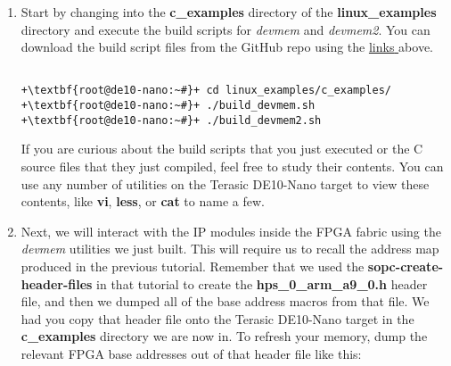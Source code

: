\begin{flushleft}
\noindent

\begin{enumerate}[
	label=\textbf{Step \arabic*.},
	leftmargin=*,
	widest={00},
	align=left]

We want to interact with the IP modules inside the FPGA fabric, and in the Linux environment there are a couple of utility programs that allow us to perform simple peek and poke operations into the memory map called \emph{devmem} and \emph{devmem2}.  These programs are not built into the default image for the Terasic DE10-Nano SD card so we had you download the source files from the internet and place them on the target so we can build them and use them.

\item Start by changing into the \textbf{c\_examples} directory of the \textbf{linux\_examples} directory and execute the build scripts for \emph{devmem} and \emph{devmem2}.  You can download the build script files from the GitHub repo using the \hyperlink{GitHub-files}{\underline{links}
} above.

\begin{verbatim}

+\textbf{root@de10-nano:~#}+ cd linux_examples/c_examples/
+\textbf{root@de10-nano:~#}+ ./build_devmem.sh
+\textbf{root@de10-nano:~#}+ ./build_devmem2.sh

\end{verbatim}

If you are curious about the build scripts that you just executed or the C source files that they just compiled, feel free to study their contents.  You can use any number of utilities on the Terasic DE10-Nano target to view these contents, like \textbf{vi}, \textbf{less}, or \textbf{cat} to name a few.

\item Next, we will interact with the IP modules inside the FPGA fabric using the \emph{devmem} utilities we just built. This will require us to recall the address map produced in the previous tutorial.  Remember that we used the \textbf{sopc-create-header-files} in that tutorial to create the \textbf{hps\_0\_arm\_a9\_0.h} header file, and then we dumped all of the base address macros from that file.  We had you copy that header file onto the Terasic DE10-Nano target in the \textbf{c\_examples} directory we are now in.  To refresh your memory, dump the relevant FPGA base addresses out of that header file like this:


\end{enumerate}
\end{flushleft}
